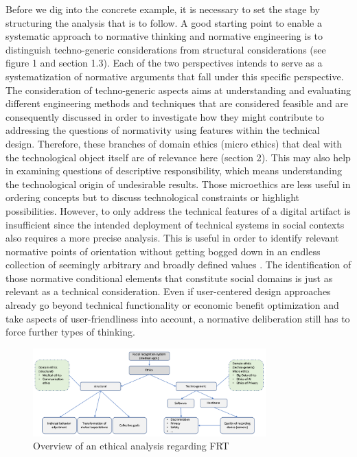 \documentclass[manuscript,screen]{acmart}
\begin{document}
Before we dig into the concrete example, it is necessary to set the stage by structuring the analysis that is to follow. A good starting point to enable a systematic approach to normative thinking and normative engineering is to distinguish techno-generic considerations from structural considerations (see figure 1 and section 1.3). Each of the two perspectives intends to serve as a systematization of normative arguments that fall under this specific perspective. The consideration of techno-generic aspects aims at understanding and evaluating different engineering methods and techniques that are considered feasible and are consequently discussed in order to investigate how they might contribute to addressing the questions of normativity using features within the technical design. Therefore, these branches of domain ethics (micro ethics) that deal with the technological object itself are of relevance here (section 2). This may also help in examining questions of descriptive responsibility, which means understanding the technological origin of undesirable results. Those microethics are less useful in ordering concepts but to discuss technological constraints or highlight possibilities. 
However, to only address the technical features of a digital artifact is insufficient since the intended deployment of technical systems in social contexts also requires a more precise analysis. This is useful in order to identify relevant normative points of orientation without getting bogged down in an endless collection of seemingly arbitrary and broadly defined values \citep{gogoll2021ethics}. The identification of those normative conditional elements that constitute social domains is just as relevant as a technical consideration. Even if user-centered design approaches already go beyond technical functionality or economic benefit optimization and take aspects of user-friendliness into account, a normative deliberation still has to force further types of thinking. 

\begin{figure}[h!]
  \caption{Overview of an ethical analysis regarding FRT}
  \includegraphics[width=0.8\textwidth]{FRT}
\end{figure}
\end{document}
